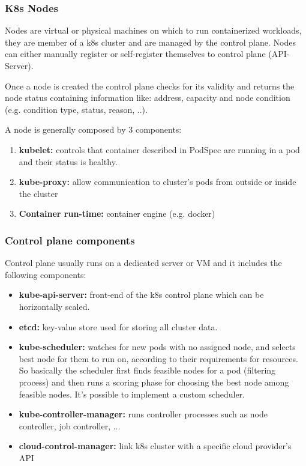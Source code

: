 \documentclass{article}
\begin{document}
\subsubsection{K8s Nodes}
Nodes are virtual or physical machines on which to run containerized workloads, they are member of a k8s cluster and are managed by the control plane. Nodes can either manually register or self-register themselves to control plane (API-Server).

Once a node is created the control plane checks for its validity and returns the node status containing information like: address, capacity and node condition (e.g. condition type, status, reason, ..).

A node is generally composed by 3 components:
\begin{enumerate}
    \item \textbf{kubelet:} controls that container described in PodSpec are running in a pod and their status is healthy.
    \item \textbf{kube-proxy:} allow communication to cluster's pods from outside or inside the cluster
    \item \textbf{Container run-time:} container engine (e.g. docker)
\end{enumerate}

\subsubsection{Control plane components}
Control plane usually runs on a dedicated server or VM and it includes the following components:
\begin{itemize}
    \item \textbf{kube-api-server:} front-end of the k8s control plane which can be horizontally scaled.
    \item \textbf{etcd:} key-value store used for storing all cluster data.
    \item \textbf{kube-scheduler:} watches for new pods with no assigned node, and selects best node for them to run on, according to their requirements for resources. So basically the scheduler first finds feasible nodes for a pod (filtering process) and then runs a scoring phase for choosing the best node among feasible nodes. It's possible to implement a custom scheduler.
    \item \textbf{kube-controller-manager:} runs controller processes such as node controller, job controller, ...
    \item \textbf{cloud-control-manager:} link k8s cluster with a specific cloud provider's API
\end{itemize}
\end{document}
